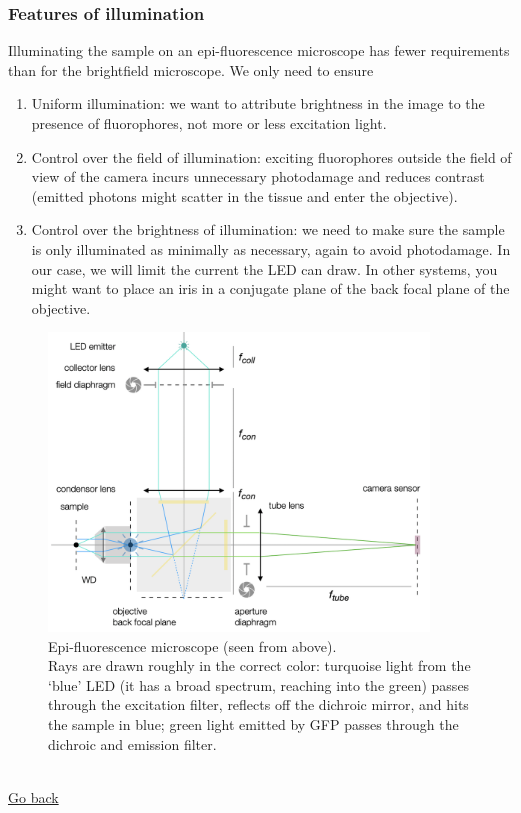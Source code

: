 \documentclass[a4paper]{report}
\begin{document}
\subsubsection{Features of illumination}
Illuminating the sample on an epi-fluorescence microscope has fewer requirements than for the brightfield microscope. We only need to ensure
\begin{enumerate}
    \item Uniform illumination: we want to attribute brightness in the image to the presence of fluorophores, not more or less excitation light.
    \item Control over the field of illumination: exciting fluorophores outside the field of view of the camera incurs unnecessary photodamage and reduces contrast (emitted photons might scatter in the tissue and enter the objective).
    \item Control over the brightness of illumination: we need to make sure the sample is only illuminated as minimally as necessary, again to avoid photodamage. In our case, we will limit the current the LED can draw. In other systems, you might want to place an iris in a conjugate plane of the back focal plane of the objective.
\end{enumerate}
\begin{figure}[h]
	\center
	\includegraphics[width=0.9\textwidth]{figures/epifluo.png}
	\captionsetup{width=0.9\textwidth}
	\caption{Epi-fluorescence microscope (seen from above).
	\\
	Rays are drawn roughly in the correct color: turquoise light from the `blue' LED (it has a broad spectrum, reaching into the green) passes through the excitation filter, reflects off the dichroic mirror, and hits the sample in blue; green light emitted by GFP passes through the dichroic and emission filter.}
	\label{fig:epifluo}
\end{figure}
\\
   \hyperlink{hintBack-illumination}{Go back}
   \clearpage

   
\end{document}
